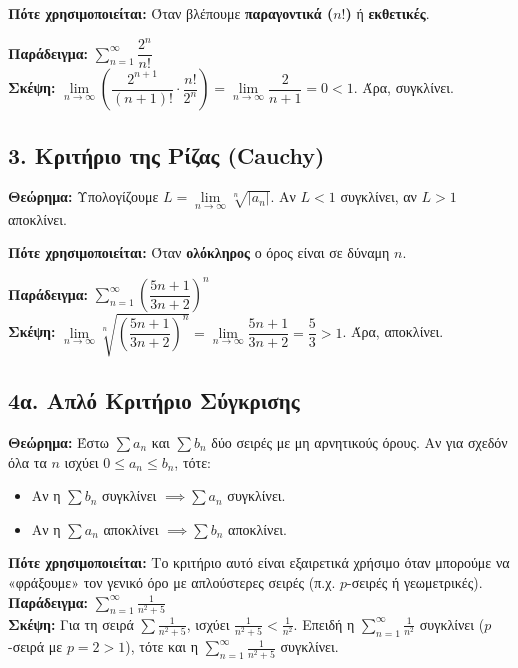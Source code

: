 \documentclass[11pt,a4paper]{article}
\newcommand{\eng}[1]{\selectlanguage{english}#1\selectlanguage{greek}}
\begin{document}
\vspace{0.2cm}
\noindent \textbf{Πότε χρησιμοποιείται:} Όταν βλέπουμε \textbf{παραγοντικά ($n!$)} ή \textbf{εκθετικές}.

\vspace{0.2cm}
\noindent \textbf{Παράδειγμα:} $\displaystyle\sum_{n=1}^{\infty} \dfrac{2^n}{n!}$ \\
\textbf{Σκέψη:} $\lim\limits_{n \to \infty} \left( \dfrac{2^{n+1}}{(n+1)!} \cdot \dfrac{n!}{2^n} \right) = \lim\limits_{n \to \infty} \dfrac{2}{n+1} = 0 < 1$. Άρα, συγκλίνει.

\subsection*{3. Κριτήριο της Ρίζας (\eng{Cauchy})}
\textbf{Θεώρημα:} Υπολογίζουμε $L = \lim\limits_{n \to \infty} \sqrt[n]{|a_n|}$. Αν $L < 1$ συγκλίνει, αν $L > 1$ αποκλίνει.

\vspace{0.2cm}
\noindent \textbf{Πότε χρησιμοποιείται:} Όταν \textbf{ολόκληρος} ο όρος είναι σε δύναμη $n$.

\vspace{0.2cm}
\noindent \textbf{Παράδειγμα:} $\displaystyle\sum_{n=1}^{\infty} \left( \dfrac{5n+1}{3n+2} \right)^n$ \\
\textbf{Σκέψη:} $\lim\limits_{n \to \infty} \sqrt[n]{\left( \dfrac{5n+1}{3n+2} \right)^n} = \lim\limits_{n \to \infty} \dfrac{5n+1}{3n+2} = \dfrac{5}{3} > 1$. Άρα, αποκλίνει.

\subsection*{4α. Απλό Κριτήριο Σύγκρισης}
\textbf{Θεώρημα:} Έστω $\sum a_n$ και $\sum b_n$ δύο σειρές με μη αρνητικούς όρους. Αν για σχεδόν όλα τα $n$ ισχύει $0 \leq a_n \leq b_n$, τότε:
\begin{itemize}
    \item Αν η $\sum b_n$ συγκλίνει $\implies \sum a_n$ συγκλίνει.
    \item Αν η $\sum a_n$ αποκλίνει $\implies \sum b_n$ αποκλίνει.
\end{itemize}
\textbf{Πότε χρησιμοποιείται:} Το κριτήριο αυτό είναι εξαιρετικά χρήσιμο όταν μπορούμε να «φράξουμε» τον γενικό όρο με απλούστερες σειρές (π.χ. $p$-σειρές ή γεωμετρικές).\\
\textbf{Παράδειγμα:} $\displaystyle\sum_{n=1}^{\infty} \frac{1}{n^2 + 5}$\\
\textbf{Σκέψη:} Για τη σειρά $\sum \frac{1}{n^2 + 5}$, ισχύει $\frac{1}{n^2 + 5} < \frac{1}{n^2}$. Επειδή η $\displaystyle\sum_{n=1}^{\infty}  \frac{1}{n^2}$ συγκλίνει ($p$-σειρά με $p=2>1$), τότε και η $\displaystyle\sum_{n=1}^{\infty}  \frac{1}{n^2 + 5}$ συγκλίνει.
\end{document}
